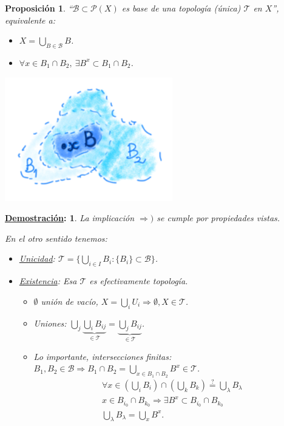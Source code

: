 \documentclass[10pt,a4paper,openright]{book}
\theoremstyle{break}
\newtheorem*{prop}{Proposición}
\newtheorem*{demo}{\underline{Demostración}:}
\begin{document}
\begin{prop}
``$\mathcal{B} \subset \mathcal{P} \left( X \right)$ es base de una topología (única) $\mathcal{T}$ en $X$'', equivalente a: 
\begin{itemize}
    \item $X = \bigcup_{B \in \mathcal{B}} B$.
    \item $\forall x \in B_1 \cap B_2,\ \exists B^x \subset B_1 \cap B_2$.
\end{itemize}
\begin{center}
    \includegraphics[scale=0.3]{images/base_unica} 
\end{center}
\end{prop}
\begin{demo}
La implicación $\Rightarrow)$ se cumple por propiedades vistas.

En el otro sentido tenemos:
\begin{itemize}
    \item \underline{Unicidad}: $\mathcal{T} = \{\bigcup_{i \in  I} B_i: \{B_i\} \subset \mathcal{B}\}$.
    \item \underline{Existencia}: Esa $\mathcal{T}$ es efectivamente topología. 
        \begin{itemize}
            \item $\emptyset$ unión de vacío, $X = \bigcup_{i} U_i \Rightarrow \emptyset, X \in \mathcal{T}$.
            \item Uniones: $\bigcup_{j} \underbrace{\bigcup_{i} B_{ij}}_{\in \mathcal{T}} = \underbrace{\bigcup_{j} B_{ij}}_{\in \mathcal{T}}$. 
            \item Lo importante, intersecciones finitas: $B_1, B_2 \in \mathcal{B} \Rightarrow B_1 \cap B_2 = \bigcup_{x \in B_1 \cap B_2} B^x \in \mathcal{T}$.
            \begin{gather*}
                \forall x \in \left( \bigcup_{i} B_i \right) \cap \left( \bigcup_{k} B_k \right) \stackrel{?}{=} \bigcup_{\lambda} B_{\lambda}\\
                x \in B_{i_0} \cap B_{k_0} \Rightarrow \exists B^x \subset B_{i_0} \cap B_{k_0} \\
                \bigcup_{\lambda} B_{\lambda} = \bigcup_{x} B^x
            .\end{gather*}
        \end{itemize}
\end{itemize}
\end{demo}
\end{document}
